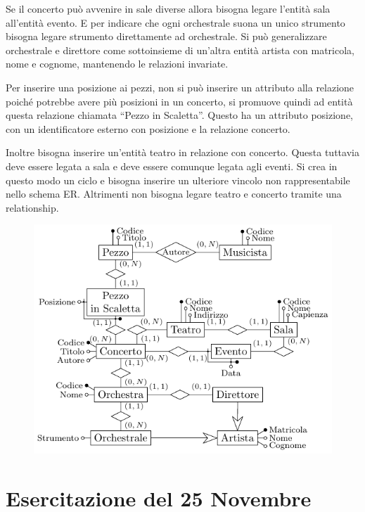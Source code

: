 \documentclass{article}
\numberwithin{equation}{subsection}
\begin{document}
Se il concerto può avvenire in sale diverse allora bisogna legare l'entità sala all'entità evento. E per indicare che ogni orchestrale suona un unico 
strumento bisogna legare strumento direttamente ad orchestrale. 
Si può generalizzare orchestrale e direttore come sottoinsieme di un'altra entità artista con matricola, nome e cognome, mantenendo le relazioni 
invariate. 

Per inserire una posizione ai pezzi, non si può inserire un attributo alla relazione poiché potrebbe avere più posizioni in un concerto, si promuove 
quindi ad entità questa relazione chiamata ``Pezzo in Scaletta''. Questo ha un attributo posizione, con un identificatore esterno con posizione e la 
relazione concerto. 

Inoltre bisogna inserire un'entità teatro in relazione con concerto. Questa tuttavia deve essere legata a sala e deve essere comunque legata agli 
eventi. Si crea in questo modo un ciclo e bisogna inserire un ulteriore vincolo non rappresentabile nello schema ER. Altrimenti non bisogna legare teatro e concerto tramite una relationship. 


\begin{figure}[H]%
    \centering%
    \includegraphics[scale=1.25]{schema_er_es_4.pdf}%
\end{figure}

\clearpage

\section{Esercitazione del 25 Novembre}
\end{document}
